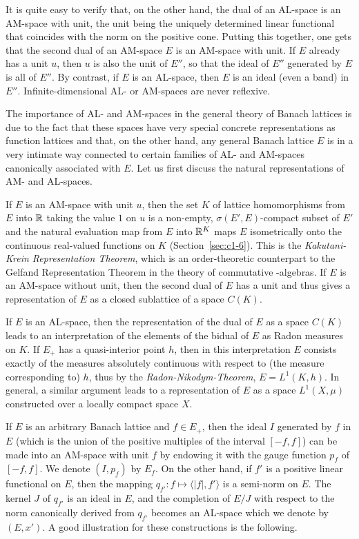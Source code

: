 It is quite easy to verify that, on the other hand, the dual of an AL-space is an AM-space with unit, the unit being the uniquely determined linear functional that coincides with the norm on the positive cone.
Putting this together, one gets that the second dual of an AM-space $ E $ is an AM-space with unit.
If\/ $ E $ already has a unit $ u $, then $ u $ is also the unit of\/ $ E'' $, so that the ideal of\/ $ E'' $ generated by $ E $ is all of\/ $ E'' $.
By contrast, if\/ $ E $ is an AL-space, then $ E $ is an ideal (even a band) in $ E'' $.
Infinite-dimensional AL- or AM-spaces are never reflexive.

The importance of AL- and AM-spaces in the general theory of Banach lattices is due to the fact that these spaces have very special concrete representations as function lattices and that, on the other hand, any general Banach lattice $ E $ is in a very intimate way connected to certain families of AL- and AM-spaces canonically associated with $ E $.
Let us first discuss the natural representations of AM- and AL-spaces.

If\/ $ E $ is an AM-space with unit $ u $, then the set $ K $ of lattice homomorphisms from $ E $ into $ \mathbb{R} $ taking the value $ 1 $ on $ u $ is a non-empty, $ \sigma(E',E) $-compact subset of\/ $ E' $ and the natural evaluation map from $ E $ into $ \mathbb{R}^{K} $ maps $ E $ isometrically onto the continuous real-valued functions on $ K $ (\cf Section~\ref{sec:c1-6}).
This is the \emph{Kakutani-Krein Representation Theorem}, which is an order-theoretic counterpart to the Gelfand Representation Theorem in the theory of commutative \CA-algebras.
If\/ $ E $ is an AM-space without unit, then the second dual of\/ $ E $ has a unit and thus gives a representation of\/ $ E $ as a closed sublattice of a space $ C(K) $.

If\/ $ E $ is an AL-space, then the representation of the dual of\/ $ E $ as a space $ C(K) $ leads to an interpretation of the elements of the bidual of\/ $ E $ as Radon measures on $ K $.
If\/ $ E_{+} $ has a quasi-interior point $ h $, then in this interpretation $ E $ consists exactly of the measures absolutely continuous with respect to (the measure corresponding to) $ h $, thus by the \emph{Radon-Nikodym-Theorem}, $ E = L^{1}(K,h) $.
In general, a similar argument leads to a representation of\/ $ E $ as a space $ L^{1}(X,\mu) $ constructed over a locally compact space $ X $.

If\/ $ E $ is an arbitrary Banach lattice and $ f \in E_{+} $, then the ideal $ I $ generated by $ f $ in $ E $ (which is the union of the positive multiples of the interval $ [-f,f] $) can be made into an AM-space with unit $ f $ by endowing it with the gauge function $ p_{f} $ of\/ $ [-f,f] $.
We denote $ (I,p_{f}) $ by $ E_{f} $.
On the other hand, if\/ $ f' $ is a positive linear functional on $ E $, then the mapping $ q_{f'} \colon f \mapsto \langle |f|,f'\rangle $ is a semi-norm on $ E $.
The kernel $ J $ of\/ $ q_{f'} $ is an ideal in $ E $, and the completion of\/ $ E/J $ with respect to the norm canonically derived from $ q_{f'} $ becomes an AL-space which we denote by $ (E,x') $.
A good illustration for these constructions is the following.

